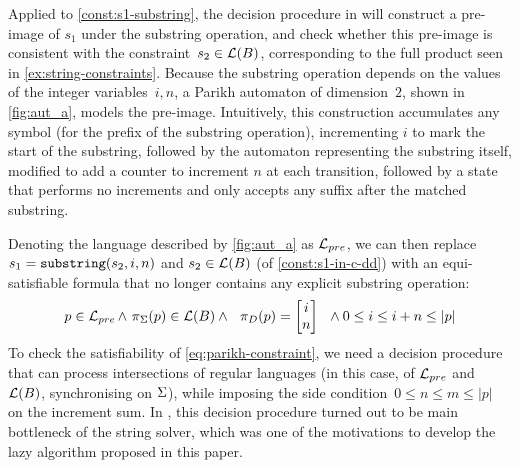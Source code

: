 Applied to \cref{const:s1-substring}, the decision procedure in
\cite{ostrich-plus} will construct a pre-image of $s_1$ under the substring
operation, and check whether this pre-image is consistent with the constraint~$s_2 \in \operatorname{\mathcal{L}}(B)$, corresponding to the full product seen in
\cref{ex:string-constraints}. Because the substring operation depends on the
values of the integer variables~$i, n$, a Parikh automaton of dimension~$2$,
shown in \cref{fig:aut_a}, models the pre-image. Intuitively, this construction
accumulates any symbol (for the prefix of the substring operation), incrementing
$i$ to mark the start of the substring, followed by the automaton representing
the substring itself, modified to add a counter to increment $n$ at each
transition, followed by a state that performs no increments and only accepts any
suffix after the matched substring.

Denoting the language described by \cref{fig:aut_a} as $\operatorname{\mathcal{L}}_{pre}$, we can
then replace $s_1 = \operatorname{\mathtt{substring}}(s_2, i, n)$ and $s_2 \in
\operatorname{\mathcal{L}}(B)$ (of \cref{const:s1-in-c-dd}) with an
equi-satisfiable formula that no longer contains any explicit substring
operation:
%
\begin{equation}
  \label{eq:parikh-constraint}
  p \in \operatorname{\mathcal{L}}_{pre} \wedge~
  \pi_\Sigma(p) \in \operatorname{\mathcal{L}}(B)
  \wedge~~ \pi_D(p) =
  \begin{bmatrix}
    i \\ n
  \end{bmatrix}~~
  \wedge 0 \leq i \leq i + n \leq |p|
\end{equation}
%
To check the satisfiability of \cref{eq:parikh-constraint}, we need a
decision procedure that can process intersections of regular languages
(in this case, of $\operatorname{\mathcal{L}}_{pre}$ and $\operatorname{\mathcal{L}}(B)$, synchronising
on $\Sigma$), while imposing the side
condition~$0 \leq n \leq m \leq |p|$ on the increment sum. In
\cite{ostrich-plus}, this decision procedure turned out to be main
bottleneck of the string solver, which was one of the motivations to
develop the lazy algorithm proposed in this paper.